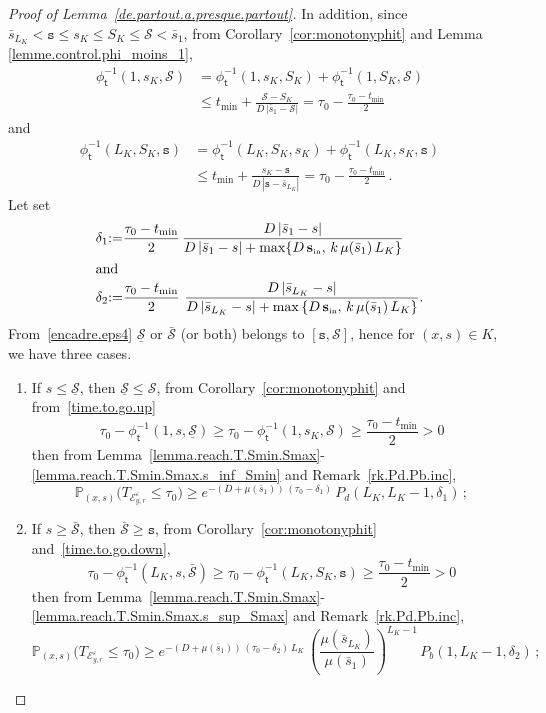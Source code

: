 \documentclass[AHL,Unicode,longabstracts,published]{cedram}
\newcommand{\PP}{\mathbb{P}}
\newcommand{\clE}{\mathcal{E}}
\newcommand{\clS}{\mathcal{S}}
\newcommand{\Sin}{{\mathbf s}_{\textrm{\tiny\rm in}}}
\newcommand{\Smin}{\underline{\mathcal{S}}}
\newcommand{\Smax}{\bar{\mathcal{S}}}
\newcommand{\SminK}{s_K}
\newcommand{\SmaxK}{S_K}
\newcommand{\barmu}{\mu(\bar s_1)}
\newcommand{\phit}{\phi_\textsf{t}^{-1}}
\newcommand{\lmax}{{L_K}}
\newcommand{\1}{\mathbf{1}}
\begin{document}
\begin{proof}[Proof of Lemma~\ref{de.partout.a.presque.partout}]
In addition, since $\bar s_{\lmax}\!<\!\texttt{s}\!\leq\!\SminK\!\leq\!\SmaxK\!\leq\!\clS\!<\!\bar s_1$, from Corollary~\ref{cor:monotonyphit} and Lemma \ref{lemme.control.phi_moins_1},
\begin{equation}\label{time.to.go.up}
\begin{split}
\phit\left(1,\SminK,\clS\right) &=
\phit\left(1,\SminK,\SmaxK\right) +
\phit\left(1,\SmaxK,\clS\right)\\
&\leq t_{\min} +
\frac{\clS-\SmaxK}{D\,|\bar s_1-\clS|} 
= \tau_0 -
\frac{\tau_0-t_{\min}}{2}
\end{split}
\end{equation}
and
\begin{equation}\label{time.to.go.down}
\begin{split}
\phit\left(\lmax,\SmaxK,\texttt{s}\right)&=
\phit\left(\lmax,\SmaxK,\SminK\right) +
\phit\left(\lmax,\SminK,\texttt{s}\right)\\
 &\leq t_{\min} +\frac{\SminK-\texttt{s}}{D\,|\texttt{s}-\bar s_\lmax|} = \tau_0 -
\frac{\tau_0-t_{\min}}{2}\,.
\end{split}
\end{equation}
Let set 
\begin{align*}
\delta_1 &{:=}\frac{\tau_0-t_{\min}}{2}\,\frac{D\,|\bar s_1-s|}{D\,|\bar s_1-s|+\max\{D\,\Sin,\,k\,\barmu\,\lmax\}}\\
\intertext{and}
\delta_2 &{:=}\frac{\tau_0-t_{\min}}{2}\,\,\frac{D\,|\bar s_\lmax-s|}{D\,|\bar s_\lmax-s|+\max\left\{D\,\Sin,\,k\,\barmu\,\lmax\right\}}.
\end{align*}
From~\eqref{encadre.eps4} $\Smin$ or $\Smax$ (or both) belongs to $[\texttt{s}, \clS]$, hence for $(x,s)\in K$, we have three cases.
\begin{enumerate}
\item If $s\leq \Smin$, then $\Smin \leq \clS$, from Corollary~\ref{cor:monotonyphit} and from~\eqref{time.to.go.up}
\[
\tau_0-\phit\left(1,s,\Smin\right)
\geq \tau_0 - \phit\left(1,\SminK,\clS\right)
\geq \frac{\tau_0-t_{\min}}{2} >0
\]
then from Lemma~\ref{lemma.reach.T.Smin.Smax}-\ref{lemma.reach.T.Smin.Smax.s_inf_Smin} and Remark~\ref{rk.Pd.Pb.inc},
\[
\PP_{(x,s)}\big(T_{\clE_{y,r}^\varepsilon}
\leq \tau_0\big)\geq e^{-(D+\barmu)\,(\tau_0-\delta_1)}\,P_d(\lmax,\lmax-1,\delta_1)\,;
\]

\item If $s\geq \Smax$, then $\Smax \geq \texttt{s}$, from Corollary~\ref{cor:monotonyphit} and~\eqref{time.to.go.down},
\[
\tau_0-\phit\left(\lmax,s,\Smax\right)
\geq \tau_0-\phit\left(\lmax,\SmaxK,\texttt{s}\right)
\geq\frac{\tau_0-t_{\min}}{2}>0
\]
then from Lemma~\ref{lemma.reach.T.Smin.Smax}-\ref{lemma.reach.T.Smin.Smax.s_sup_Smax} and Remark~\ref{rk.Pd.Pb.inc},
\[
\PP_{(x,s)}\big(T_{\clE_{y,r}^\varepsilon}
\leq \tau_0\big)\geq e^{-(D+\barmu)\,(\tau_0-\delta_2)\,\lmax}\,
\left(\frac{\mu(\bar s_{\lmax})}{\barmu}\right)^{\lmax-1}\,P_b(1,\lmax-1, \delta_2)\,;
\]


\end{enumerate}
\end{proof}
\end{document}
